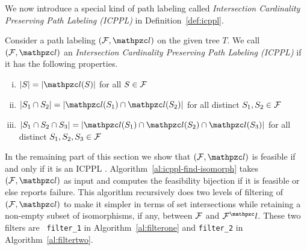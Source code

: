 We now introduce a special kind of path labeling called {\em
  Intersection Cardinality Preserving Path Labeling (ICPPL)} in
Definition~\ref{def:icppl}.

\begin{definition}
  \label{def:icppl}
  Consider a path labeling $(\cF, \cl)$ on the given tree $T$. We call
  $(\cF, \cl)$ an {\em Intersection Cardinality Preserving Path
    Labeling (ICPPL)} if it has the following properties.
  \par
  \parbox{\linewidth}{%
    \hangindent {}%
    \begin{enumerate}[i. ] %
      \singlespacing
    \item \label{pr:i} $|S| = |\cl(S)|$ for all $S \in {\cal F}$
    \item \label{pr:ii}$|S_1 \cap S_2| = |\cl(S_1) \cap \cl(S_2)|$ for
    all distinct $S_1, S_2 \in {\cal F}$
    \item \label{pr:iii}$|S_1 \cap S_2 \cap S_3| = |\cl(S_1) \cap
    \cl(S_2) \cap \cl(S_3)|$ for all distinct $S_1, S_2, S_3 \in {\cal F}$
    \end{enumerate}
  }
\end{definition}


In the remaining part of this section we show that $(\cF, \cl)$ is
feasible if and only if it is an ICPPL%
.  Algorithm~\ref{al:icppl-find-isomorph} takes $(\cF, \cl)$ as input
and computes the feasibility bijection if it is feasible or else
reports failure. This algorithm recursively does two levels of
filtering of $(\cF, \cl)$ to make it simpler in terms of set
intersections while retaining a non-empty subset of isomorphisms, if
any, between ${\cal F}$ and $\cF^\cl$. These two filters are {\tt
  filter\_1} in Algorithm~\ref{al:filterone} and {\tt filter\_2} in
Algorithm~\ref{al:filtertwo}.


